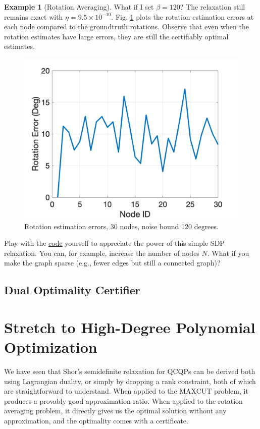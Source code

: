 \documentclass[
]{book}
\theoremstyle{definition}
\theoremstyle{definition}
\newtheorem{example}{Example}[chapter]
\theoremstyle{definition}
\theoremstyle{definition}
\theoremstyle{remark}
\begin{document}
\begin{example}[Rotation Averaging]
What if I set \(\beta = 120\)? The relaxation still remains exact with \(\eta = 9.5 \times 10^{-10}\). Fig. \ref{fig:MVA-rot-err-30-120} plots the rotation estimation errors at each node compared to the groundtruth rotations. Observe that even when the rotation estimates have large errors, they are still the certifiably optimal estimates.

\begin{figure}

{\centering \includegraphics[width=0.6\linewidth]{images/mva_rot_err_30_120} 

}

\caption{Rotation estimation errors, 30 nodes, noise bound 120 degrees.}\label{fig:MVA-rot-err-30-120}
\end{figure}

Play with the \href{https://github.com/ComputationalRobotics/Semidefinite-Examples/blob/main/rotation_averaging/example.m}{code} yourself to appreciate the power of this simple SDP relaxation. You can, for example, increase the number of nodes \(N\). What if you make the graph sparse (e.g., fewer edges but still a connected graph)?
\end{example}

\subsection{Dual Optimality Certifier}\label{dual-optimality-certifier}

\section{Stretch to High-Degree Polynomial Optimization}\label{stretch-to-high-degree-polynomial-optimization}

We have seen that Shor's semidefinite relaxation for QCQPs can be derived both using Lagrangian duality, or simply by dropping a rank constraint, both of which are straightforward to understand. When applied to the MAXCUT problem, it produces a provably good approximation ratio. When applied to the rotation averaging problem, it directly gives us the optimal solution without any approximation, and the optimality comes with a certificate.
\end{document}
